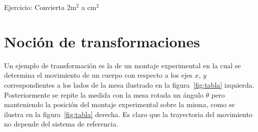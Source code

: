 \documentclass[11pt,a4paper]{article}
\begin{document}
Ejercicio: Convierta $2\text{m}^2$ a $\text{cm}^2$



\section{Noción de transformaciones}

Un ejemplo de transformación es la de un montaje experimental en la cual se determina el movimiento de un cuerpo con respecto a los ejes $x$, $y$ correspondientes a los lados de la mesa ilustrado en la figura~\ref{fig:tabla} izquierda. Posteriormente se repite la medida con la mesa rotada un ángulo $\theta$ pero manteniendo la posición del montaje experimental sobre la misma, como se ilustra en la figura~\ref{fig:tabla} derecha. Es claro que la trayectoria del movimiento no depende del sistema de referencia.
\end{document}
